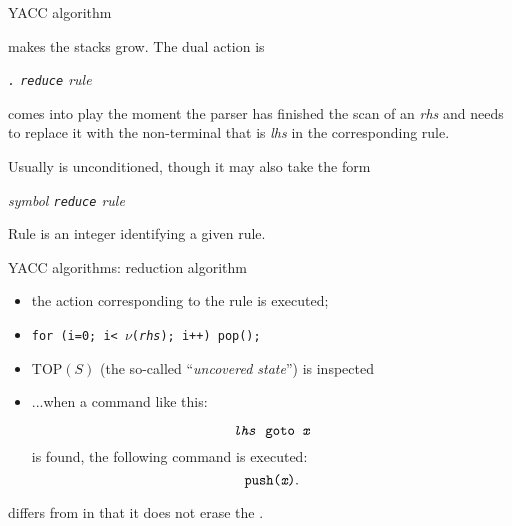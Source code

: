 \begin{frame}[fragile]{YACC algorithm}

\shift{} makes the stacks grow. The dual action is


\vspace{20pt}

\begin{center}\fbox{\reduce}\end{center}
\begin{center}\em  {\tt .}   {\tt reduce}  rule \end{center}


\vspace{20pt}

\reduce{} comes into play the moment the parser has finished
the scan of an
{\em rhs\/} and needs to replace it with the non-terminal that is
{\em lhs\/} in the corresponding rule.


\vspace{20pt}

Usually \reduce{} is unconditioned, though it may also take the form
\begin{center}\em  symbol   {\tt reduce}  rule \end{center}


\vspace{20pt}

Rule is an integer identifying a given rule.
\end{frame}

\begin{frame}[fragile]{YACC algorithms: reduction algorithm}
\begin{itemize}
\item the action corresponding to the rule is executed;
\item {\tt for (i=0; i< $\nu$({\em rhs}); i++) pop();}
\item TOP$(S)$ (the so-called ``{\em uncovered state\/}'') is inspected
\item ...when a command like this:

\[ \hbox{\tt{\em lhs\/} goto {\em x}} \]
is found, the following command is executed:
\[ \hbox{\tt push({\em x})}. \]
\end{itemize}


\vspace{20pt}

\goto{} differs from \shift{} in that it does not
erase the \lat.
\end{frame}

